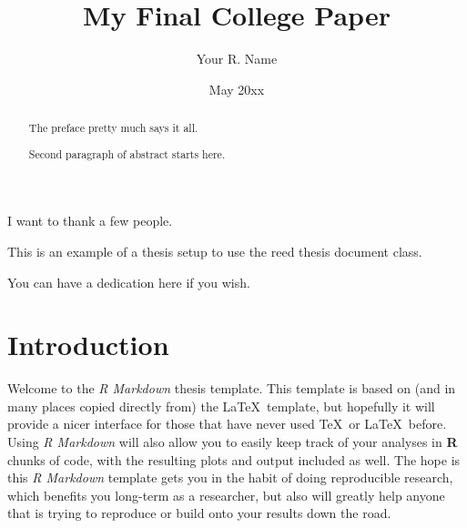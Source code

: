 \documentclass[12pt,twoside]{reedthesis}
\title{My Final College Paper}
\author{Your R. Name}
\date{May 20xx}
\begin{document}
      \maketitle
  
  \frontmatter %
  \pagestyle{empty} %

      \begin{acknowledgements}
      I want to thank a few people.
    \end{acknowledgements}
  
      \begin{preface}
      This is an example of a thesis setup to use the reed thesis document
      class.
    \end{preface}
  
      \hypersetup{linkcolor=black}
    \setcounter{tocdepth}{2}
    \tableofcontents
  
      \listoftables
  
      \listoffigures
  
      \begin{abstract}
      The preface pretty much says it all. \par  Second paragraph of abstract
      starts here.
    \end{abstract}
  
      \begin{dedication}
      You can have a dedication here if you wish.
    \end{dedication}
  
  \mainmatter %
  \pagestyle{fancyplain} %

  \chapter*{Introduction}\label{introduction}
  
  Welcome to the \emph{R Markdown} thesis template. This template is based
  on (and in many places copied directly from) the \LaTeX~template, but
  hopefully it will provide a nicer interface for those that have never
  used \TeX~or \LaTeX~before. Using \emph{R Markdown} will also allow you
  to easily keep track of your analyses in \textbf{R} chunks of code, with
  the resulting plots and output included as well. The hope is this
  \emph{R Markdown} template gets you in the habit of doing reproducible
  research, which benefits you long-term as a researcher, but also will
  greatly help anyone that is trying to reproduce or build onto your
  results down the road.
  
\end{document}

